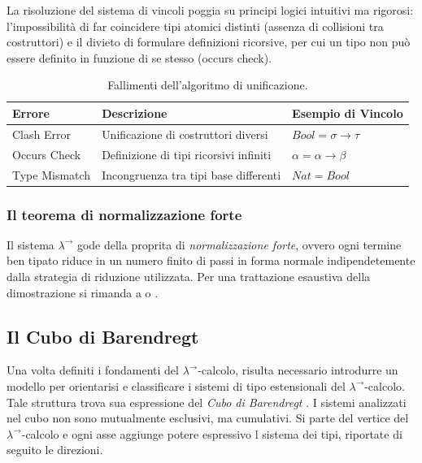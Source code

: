 La risoluzione del sistema di vincoli poggia su principi logici intuitivi ma rigorosi: 
l'impossibilità di far coincidere tipi atomici distinti (assenza di collisioni tra costruttori) e 
il divieto di formulare definizioni ricorsive, per cui un tipo non può essere definito in funzione di se stesso (occurs check).
\begin{table}[h]
    \centering \small
    \begin{tabular}{lp{5cm}l}
        \hline
        \textbf{Errore} & \textbf{Descrizione}                   & \textbf{Esempio di Vincolo}  \\ \hline
        Clash Error     & Unificazione di costruttori diversi    & $Bool = \sigma \to \tau$     \\
        Occurs Check    & Definizione di tipi ricorsivi infiniti & $\alpha = \alpha \to \beta$  \\
        Type Mismatch   & Incongruenza tra tipi base differenti  & $Nat = Bool$                 \\ \hline
    \end{tabular}
    \caption{Fallimenti dell'algoritmo di unificazione.}
    \label{tab:unification_failures}
\end{table}

\subsubsection{Il teorema di normalizzazione forte}
Il sistema $\lambda^{\to}$ gode della proprita di \emph{normalizzazione forte}, ovvero ogni termine ben tipato riduce in un numero finito di passi
in forma normale indipendetemente dalla strategia di riduzione utilizzata. Per una trattazione esaustiva della dimostrazione si rimanda a \cite{Girard1989} o
\cite{Hindley1997}.

\subsection{Il Cubo di Barendregt}
Una volta definiti i fondamenti del $\lambda^{\to}$-calcolo, risulta necessario introdurre un modello per orientarisi e classificare
i sistemi di tipo estensionali del $\lambda^{\to}$-calcolo. Tale struttura trova sua espressione del \emph{Cubo di Barendregt} \cite{barendregt1992}.
I sistemi analizzati nel cubo non sono mutualmente esclusivi, ma cumulativi. Si parte del vertice del $\lambda^{\to}$-calcolo e ogni
asse aggiunge potere espressivo l sistema dei tipi, riportate di seguito le direzioni.


